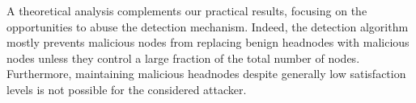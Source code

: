 A theoretical analysis complements our practical results, focusing on the opportunities to abuse the detection mechanism. 
Indeed, the detection algorithm mostly prevents malicious nodes from replacing benign headnodes with malicious nodes unless they control a large fraction of the total number of nodes. 
Furthermore, maintaining malicious headnodes despite generally low satisfaction levels is not possible for the considered attacker. 
  
% 
